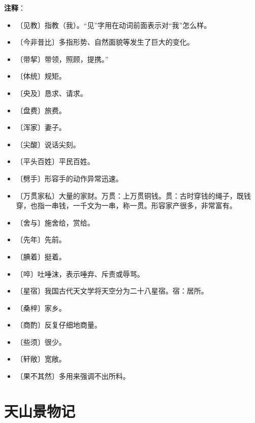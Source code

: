 \documentclass[12pt,UTF-8,openany]{ctexbook}
\begin{document}
\newpage

\textbf{注释}：

\vspace{-1em}

\begin{itemize}
    \setlength\itemsep{-0.2em}
    \item 〔见教〕指教（我）。“见”字用在动词前面表示对“我”怎么样。
    \item 〔今非昔比〕多指形势、自然面貌等发生了巨大的变化。
    \item 〔带挈〕带领，照顾，提携。”
    \item 〔体统〕规矩。
    \item 〔央及〕恳求、请求。
    \item 〔盘费〕旅费。
    \item 〔浑家〕妻子。
    \item 〔尖酸〕说话尖刻。
    \item 〔平头百姓〕平民百姓。
    \item 〔劈手〕形容手的动作异常迅速。
    \item 〔万贯家私〕大量的家财。万贯：上万贯铜钱。贯：古时穿钱的绳子，既钱穿，也指一串钱，一千文为一串，称一贯。形容家产很多，非常富有。
    \item 〔舍与〕施舍给，赏给。
    \item 〔先年〕先前。
    \item 〔腆着〕挺着。
    \item 〔啐〕吐唾沫，表示唾弃、斥责或辱骂。
    \item 〔星宿〕我国古代天文学将天空分为二十八星宿。宿：居所。
    \item 〔桑梓〕家乡。
    \item 〔商酌〕反复仔细地商量。
    \item 〔些须〕很少。
    \item 〔轩敞〕宽敞。
    \item 〔果不其然〕多用来强调不出所料。
\end{itemize}

\chapter{天山景物记}
\end{document}

